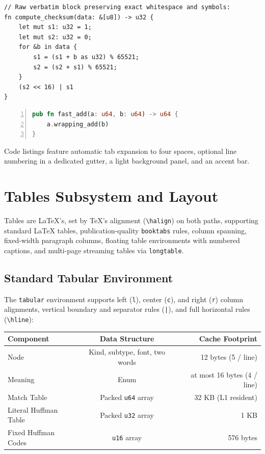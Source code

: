 \documentclass[11pt, a4paper]{article}
\begin{document}
\begin{verbatim}
// Raw verbatim block preserving exact whitespace and symbols:
fn compute_checksum(data: &[u8]) -> u32 {
    let mut s1: u32 = 1;
    let mut s2: u32 = 0;
    for &b in data {
        s1 = (s1 + b as u32) % 65521;
        s2 = (s2 + s1) % 65521;
    }
    (s2 << 16) | s1
}
\end{verbatim}

\begin{lstlisting}[language=Rust, numbers=left]
pub fn fast_add(a: u64, b: u64) -> u64 {
    a.wrapping_add(b)
}
\end{lstlisting}

Code listings feature automatic tab expansion to four spaces, optional line numbering in a dedicated gutter, a light background panel, and an accent bar.

\section{Tables Subsystem and Layout}
Tables are LaTeX's, set by TeX's alignment (\verb|\halign|) on both paths, supporting standard LaTeX tables, publication-quality \texttt{booktabs} rules, column spanning, fixed-width paragraph columns, floating table environments with numbered captions, and multi-page streaming tables via \texttt{longtable}.

\subsection{Standard Tabular Environment}
The \texttt{tabular} environment supports left (\texttt{l}), center (\texttt{c}), and right (\texttt{r}) column alignments, vertical boundary and separator rules (\texttt{|}), and full horizontal rules (\verb|\hline|):

\medskip

\begin{tabular}{|l|c|r|}
\hline
\textbf{Component} & \textbf{Data Structure} & \textbf{Cache Footprint} \\
\hline
Node & Kind, subtype, font, two words & 12 bytes (5 / line) \\
Meaning & Enum & at most 16 bytes (4 / line) \\
Match Table & Packed \texttt{u64} array & 32 KB (L1 resident) \\
Literal Huffman Table & Packed \texttt{u32} array & 1 KB \\
Fixed Huffman Codes & \texttt{u16} array & 576 bytes \\
\hline
\end{tabular}
\end{document}
